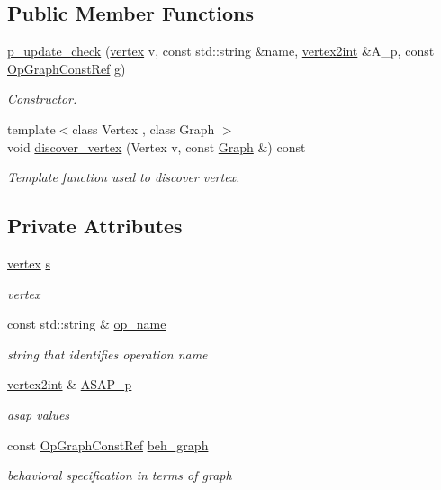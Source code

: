 \subsection*{Public Member Functions}
\begin{DoxyCompactItemize}
\item 
\hyperlink{structp__update__check_ad7bc7e03d9cf28176dd84cfe0280eddf}{p\+\_\+update\+\_\+check} (\hyperlink{graph_8hpp_abefdcf0544e601805af44eca032cca14}{vertex} v, const std\+::string \&name, \hyperlink{structvertex2int}{vertex2int} \&A\+\_\+p, const \hyperlink{op__graph_8hpp_a9a0b240622c47584bee6951a6f5de746}{Op\+Graph\+Const\+Ref} g)
\begin{DoxyCompactList}\small\item\em Constructor. \end{DoxyCompactList}\item 
{\footnotesize template$<$class Vertex , class Graph $>$ }\\void \hyperlink{structp__update__check_af49822a0e6841ca43018a41786178b4f}{discover\+\_\+vertex} (Vertex v, const \hyperlink{structGraph}{Graph} \&) const
\begin{DoxyCompactList}\small\item\em Template function used to discover vertex. \end{DoxyCompactList}\end{DoxyCompactItemize}
\subsection*{Private Attributes}
\begin{DoxyCompactItemize}
\item 
\hyperlink{graph_8hpp_abefdcf0544e601805af44eca032cca14}{vertex} \hyperlink{structp__update__check_a437540c1bdd220c67af9c9ed0ce9694a}{s}
\begin{DoxyCompactList}\small\item\em vertex \end{DoxyCompactList}\item 
const std\+::string \& \hyperlink{structp__update__check_a06300c3b747d6747ad4809702bb7d73b}{op\+\_\+name}
\begin{DoxyCompactList}\small\item\em string that identifies operation name \end{DoxyCompactList}\item 
\hyperlink{structvertex2int}{vertex2int} \& \hyperlink{structp__update__check_a3604a79f6598f721d36e5cf54852eec1}{A\+S\+A\+P\+\_\+p}
\begin{DoxyCompactList}\small\item\em asap values \end{DoxyCompactList}\item 
const \hyperlink{op__graph_8hpp_a9a0b240622c47584bee6951a6f5de746}{Op\+Graph\+Const\+Ref} \hyperlink{structp__update__check_a43601397114040ac12090019f8ea9764}{beh\+\_\+graph}
\begin{DoxyCompactList}\small\item\em behavioral specification in terms of graph \end{DoxyCompactList}\end{DoxyCompactItemize}


